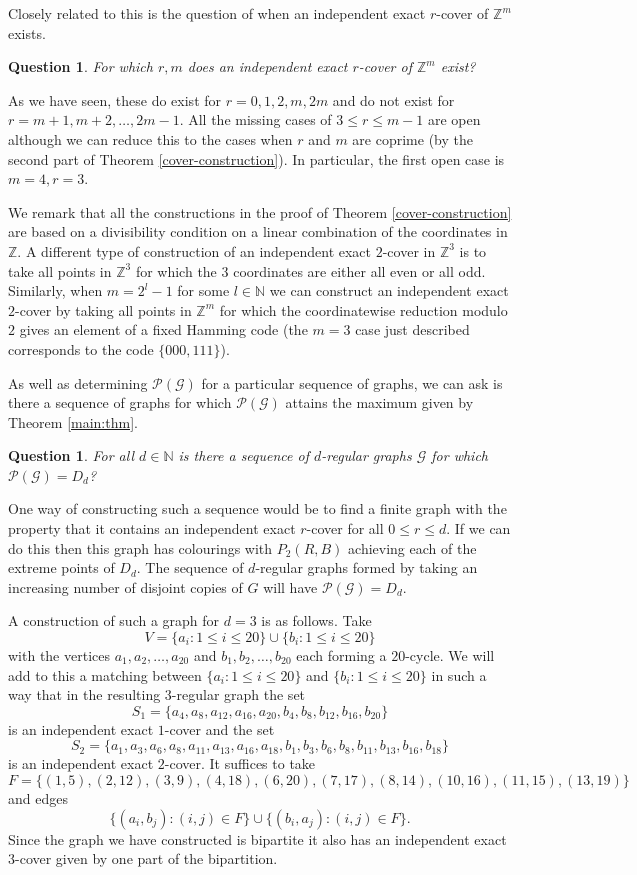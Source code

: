 \documentclass[12pt,a4paper]{article}
\newcommand{\Z}{\mathbb Z}
\newcommand{\N}{\mathbb N}
\newcommand{\G}{\mathcal G}
\newcommand{\Pcal}{\mathcal P}
\newtheorem{q}[thm]{Question}
\begin{document}
Closely related to this is the question of when an independent exact $r$-cover of $\Z^m$ exists. 
\begin{q}
For which $r,m$ does an independent exact $r$-cover of $\Z^m$ exist?
\end{q}
As we have seen, these do exist for $r=0,1,2,m,2m$ and do not exist for $r=m+1,m+2,\ldots,2m-1$. All the missing cases of $3\leq r\leq m-1$ are open although we can reduce this to the cases when $r$ and $m$ are coprime (by the second part of Theorem \ref{cover-construction}). In particular, the first open case is $m=4, r=3$. 

We remark that all the constructions in the proof of Theorem \ref{cover-construction} are based on a divisibility condition on a linear combination of the coordinates in $\Z$. A different type of construction of an independent exact $2$-cover in $\Z^3$ is to take all points in $\Z^3$ for which the $3$ coordinates are either all even or all odd. Similarly, when $m=2^l-1$ for some $l\in\N$ we can construct an independent exact $2$-cover by taking all points in $\Z^m$ for which the coordinatewise reduction modulo $2$ gives an element of a fixed Hamming code (the $m=3$ case just described corresponds to the code $\{000,111\}$). 

As well as determining $\Pcal(\G)$ for a particular sequence of graphs, we can ask is there a sequence of graphs for which $\Pcal(\G)$ attains the maximum given by Theorem \ref{main:thm}.

\begin{q}
For all $d\in\N$ is there a sequence of $d$-regular graphs $\G$ for which $\Pcal(\G)=D_d$?
\end{q}

One way of constructing such a sequence would be to find a finite graph with the property that it contains an independent exact $r$-cover for all $0\leq r\leq d$. If we can do this then this graph has colourings with $P_2(R,B)$ achieving each of the extreme points of $D_d$. The sequence of $d$-regular graphs formed by taking an increasing number of disjoint copies of $G$ will have $\Pcal(\G)=D_d$.

A construction of such a graph for $d=3$ is as follows. Take
\[
V=\{a_i : 1\leq i\leq 20\}\cup\{b_i : 1\leq i\leq 20\}
\]
with the vertices $a_1,a_2,\ldots,a_{20}$ and $b_1,b_2,\ldots,b_{20}$ each forming a $20$-cycle. We will add to this a matching between $\{a_i : 1\leq i\leq 20\}$ and $\{b_i : 1\leq i\leq 20\}$ in such a way that in the resulting $3$-regular graph the set
\[
S_1=\{a_4,a_8,a_{12},a_{16},a_{20},b_4,b_8,b_{12},b_{16},b_{20}\}
\]
is an independent exact $1$-cover and the set
\[
S_2=\{a_1,a_3,a_6,a_8,a_{11},a_{13},a_{16},a_{18},b_1,b_3,b_6,b_8,b_{11},b_{13},b_{16},b_{18}\}
\]
is an independent exact $2$-cover. It suffices to take
\[
F=\{(1,5),(2,12),(3,9),(4,18),(6,20),(7,17),(8,14),(10,16),(11,15),(13,19)\}
\]
and  edges
\[
\{(a_i,b_j) : (i,j)\in F\}\cup \{(b_i,a_j) : (i,j)\in F\}.
\]
Since the graph we have constructed is bipartite it also has an independent exact $3$-cover given by one part of the bipartition.
\end{document}
